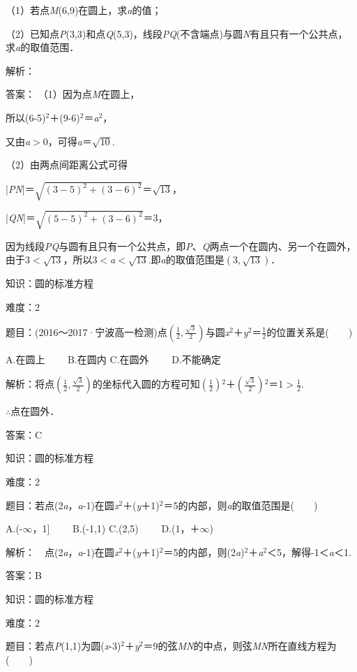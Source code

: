 \documentclass{article} %
\begin{document}
（1）若点\textit{M}(6,9)在圆上，求\textit{a}的值；

（2）已知点\textit{P}(3,3)和点\textit{Q}(5,3)，线段\textit{PQ}(不含端点)与圆\textit{N}有且只有一个公共点，求\textit{a}的取值范围．

解析：

答案：
（1）因为点\textit{M}在圆上，

所以(6-5)${}^{2}$＋(9-6)${}^{2}$＝\textit{a}${}^{2}$，

又由\textit{a}$\mathrm{>}$0，可得\textit{a}＝$\sqrt{10}$.

（2）由两点间距离公式可得

|\textit{PN}|＝$\sqrt{(3-5)^2+(3-6)^2}$＝$\sqrt{13}$，

|\textit{QN}|＝$\sqrt{(5-5)^2+(3-6)^2}$＝3，

因为线段\textit{PQ}与圆有且只有一个公共点，即\textit{P}、\textit{Q}两点一个在圆内、另一个在圆外，由于3$\mathrm{<}\sqrt{13}$，所以3$\mathrm{<}$\textit{a}$\mathrm{<}\sqrt{13}$.即\textit{a}的取值范围是$(3,\sqrt{13})$．

知识：圆的标准方程

难度：2

题目：(2016～2017·宁波高一检测)点$(\frac{1}{2},\frac{\sqrt{3}}{2})$与圆\textit{x}${}^{2}$＋\textit{y}${}^{2}$＝$\frac{1}{2}$的位置关系是(　　)

A.在圆上　　 B.在圆内 C.在圆外　　 D.不能确定

解析：将点$(\frac{1}{2},\frac{\sqrt{3}}{2})$的坐标代入圆的方程可知$(\frac{1}{2}){}^{2}$＋$(\frac{\sqrt{3}}{2}){}^{2}$＝1$\mathrm{>}\frac{1}{2}$.

$\mathrm{\therefore}$点在圆外．

答案：C

知识：圆的标准方程

难度：2

题目：若点(2\textit{a}，\textit{a}-1)在圆\textit{x}${}^{2}$＋(\textit{y}＋1)${}^{2}$＝5的内部，则\textit{a}的取值范围是(　　)

A.(-$\mathrm{\infty}$，1]　　 B.(-1,1) C.(2,5)　　 D.(1，＋$\mathrm{\infty}$)

解析：　点(2\textit{a}，\textit{a}-1)在圆\textit{x}${}^{2}$＋(\textit{y}＋1)${}^{2}$＝5的内部，则(2\textit{a})${}^{2}$＋\textit{a}${}^{2}$＜5，解得-1＜\textit{a}＜1.

答案：B

知识：圆的标准方程

难度：2

题目：若点\textit{P}(1,1)为圆(\textit{x}-3)${}^{2}$＋\textit{y}${}^{2}$＝9的弦\textit{MN}的中点，则弦\textit{MN}所在直线方程为(　　)
\end{document}
